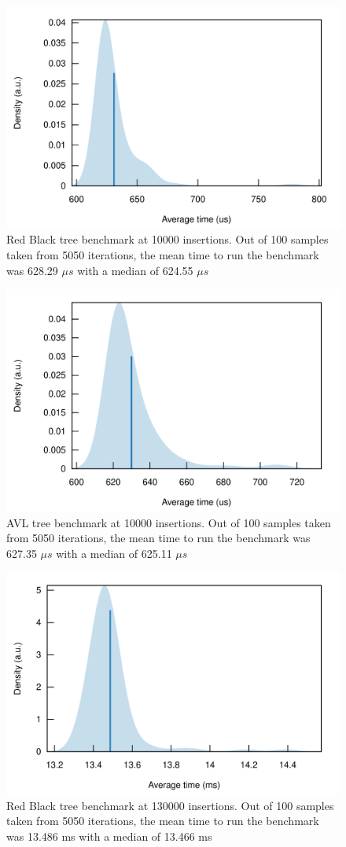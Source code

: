 \documentclass[letterpaper]{article}
\begin{document}
\begin{figure}[H]
      \centering
      \includegraphics[width=.8\textwidth]{rbsmol.png}
      \caption{Red Black tree benchmark at 10000 insertions. Out of 100 samples
      taken from 5050 iterations, the mean time to run the benchmark was 628.29
    $\mu s$ with a median of 624.55 $\mu s$}
\end{figure}

\begin{figure}[H]
      \centering
      \includegraphics[width=.8\textwidth]{avlsmol.png}
      \caption{AVL tree benchmark at 10000 insertions. Out of 100 samples taken
        from 5050 iterations,
      the mean time to run the benchmark was 627.35 $\mu s$ with a median of
    625.11 $\mu s$}
\end{figure}

\begin{figure}[H]
      \centering
      \includegraphics[width=.8\textwidth]{rbbeeg.png}
      \caption{Red Black tree benchmark at 130000 insertions. Out of 100 samples
      taken from 5050 iterations, the mean time to run the benchmark was 13.486
      ms with a median of 13.466 ms}
\end{figure}
\end{document}
